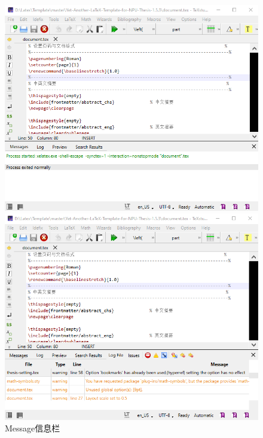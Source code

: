\documentclass[12pt]{book}
\begin{document}
\begin{figure}[htbp]
	\centering
	\begin{minipage}[c]{0.45\linewidth}
		\includegraphics[scale=0.4]{texstudio-message.png}
	\end{minipage}
	\begin{minipage}[c]{0.4\linewidth}
		\includegraphics[scale=0.4]{texstudio-error.png}
	\end{minipage}
	\caption{Message信息栏}
\end{figure}
\end{document}
